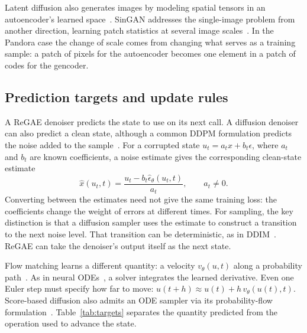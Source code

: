 Latent diffusion also generates images by modeling spatial tensors in an autoencoder's learned space~\cite{ldm}. SinGAN addresses the single-image problem from another direction, learning patch statistics at several image scales~\cite{singan}. In the Pandora case the change of scale comes from changing what serves as a training sample: a patch of pixels for the autoencoder becomes one element in a patch of codes for the gencoder.

\subsection{Prediction targets and update rules}
\label{sec:targets}

A ReGAE denoiser predicts the state to use on its next call. A diffusion denoiser can also predict a clean state, although a common DDPM formulation predicts the noise added to the sample~\cite{ddpm,chan2024}. For a corrupted state $u_t=a_t x+b_t\epsilon$, where $a_t$ and $b_t$ are known coefficients, a noise estimate gives the corresponding clean-state estimate
\begin{equation}
 \widehat x(u_t,t)=\frac{u_t-b_t\widehat\epsilon_\theta(u_t,t)}{a_t},
 \qquad a_t\ne0.
 \label{eq:target-conversion}
\end{equation}
Converting between the estimates need not give the same training loss: the coefficients change the weight of errors at different times. For sampling, the key distinction is that a diffusion sampler uses the estimate to construct a transition to the next noise level. That transition can be deterministic, as in DDIM~\cite{ddim}. ReGAE can take the denoiser's output itself as the next state.

Flow matching learns a different quantity: a velocity $v_\theta(u,t)$ along a probability path~\cite{flowmatching}. As in neural ODEs~\cite{neuralode}, a solver integrates the learned derivative. Even one Euler step must specify how far to move: $u(t+h)\approx u(t)+h\,v_\theta(u(t),t)$. Score-based diffusion also admits an ODE sampler via its probability-flow formulation~\cite{sde}. Table~\ref{tab:targets} separates the quantity predicted from the operation used to advance the state.

